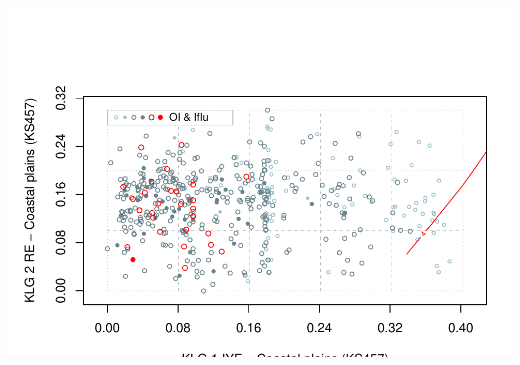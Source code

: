 \documentclass[]{article}
\begin{document}
\includegraphics{Landscape_analysis_example_4_files/figure-latex/unnamed-chunk-43-1.pdf}
\end{document}
